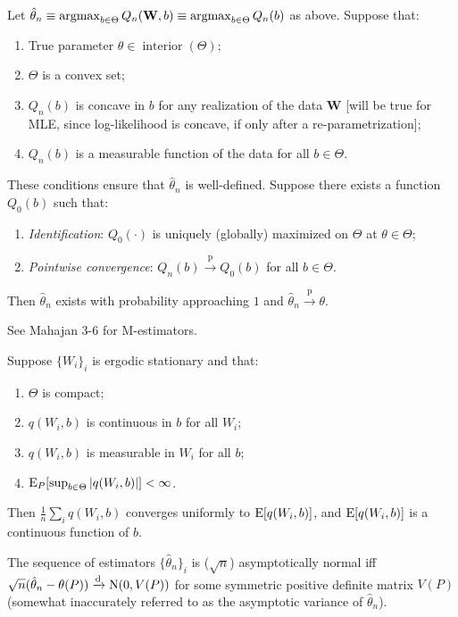 \documentclass[8pt,letterpaper, landscape]{extarticle} %
\begin{document}
\begin{multicols}{3}
\begin{description}
 Let $ \hat{\theta}_n \equiv \operatorname*{argmax}_{b \in \Theta} Q_n (\mathbf{W}, b) \equiv \operatorname*{argmax}_{b \in \Theta} Q_n (b) $ as above. Suppose that:
\begin{enumerate}
\item True parameter $ \theta \in \operatorname{interior} (\Theta) $;
\item $ \Theta $ is a convex set;
\item $ Q_n (b) $ is concave in $ b $ for any realization of the data $ \mathbf{W} $ [will be true for MLE, since log-likelihood is concave, if only after a re-parametrization];
\item $ Q_n (b) $ is a measurable function of the data for all $ b \in \Theta $.
\end{enumerate}
These conditions ensure that $ \hat{\theta}_n $ is well-defined. Suppose there exists a function $ Q_0 (b) $ such that:
\begin{enumerate}
\item \textit{Identification}: $ Q_0 (\cdot) $ is uniquely (globally) maximized on $ \Theta $ at $ \theta \in \Theta $;
\item \textit{Pointwise convergence}: $ Q_n (b) \xrightarrow{\text{p}} Q_0 (b) $ for all $ b \in \Theta $.
\end{enumerate}
Then $ \hat{\theta}_n $ exists with probability approaching $ 1 $ and $ \hat{\theta}_n \xrightarrow{\text{p}} \theta $.

See Mahajan 3-6 for M-estimators.

 Suppose $ \{ W_i \}_{i} $ is ergodic stationary and that:
\begin{enumerate}
\item $ \Theta $ is compact;
\item $ q(W_i, b) $ is continuous in $ b $ for all $ W_i $;
\item $ q(W_i, b) $ is measurable in $ W_i $ for all $ b $;
\item $ \operatorname{E}_P [\sup_{b \in \Theta} | q(W_i, b)| ] < \infty $.
\end{enumerate}
Then $ \tfrac{1}{n} \sum_{i} q(W_i, b) $ converges uniformly to $ \operatorname{E} [q(W_i, b)] $, and $ \operatorname{E} [q(W_i, b)] $ is a continuous function of $ b $.

 The sequence of estimators $ \{ \hat{\theta}_n \}_i $ is ($ \sqrt{n} $) asymptotically normal iff $ \sqrt{n} (\hat{\theta}_n - \theta(P)) \xrightarrow{\text{d}} \operatorname{N} (0, V(P)) $ for some symmetric positive definite matrix $ V(P) $ (somewhat inaccurately referred to as the asymptotic variance of $ \hat{\theta}_n $).


\end{description}
\end{multicols}
\end{document}
